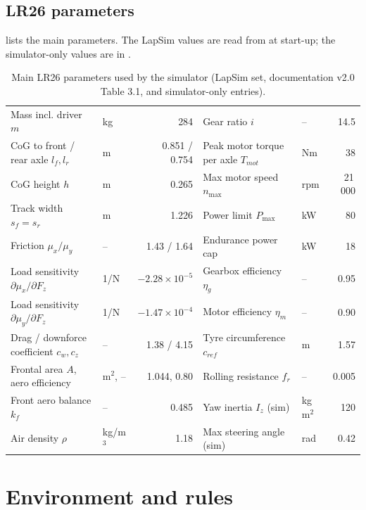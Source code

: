 \documentclass[11pt]{article}
\begin{document}
\subsection{LR26 parameters}
 lists the main parameters. The LapSim values are read from  at start-up; the
simulator-only values are in .

\begin{table}[t]
\centering\small
\caption{Main LR26 parameters used by the simulator (LapSim set, documentation v2.0 Table 3.1, and simulator-only
entries).}
\label{tab:params}
\setlength{\tabcolsep}{4pt}\footnotesize
\begin{tabular}{@{}llr|llr@{}}
\toprule
Mass incl. driver $m$ & kg & 284 & Gear ratio $i$ & -- & 14.5\\
CoG to front / rear axle $l_f,l_r$ & m & 0.851 / 0.754 & Peak motor torque per axle $T_{mot}$ & Nm & 38\\
CoG height $h$ & m & 0.265 & Max motor speed $n_{\max}$ & rpm & 21\,000\\
Track width $s_f=s_r$ & m & 1.226 & Power limit $P_{\max}$ & kW & 80\\
Friction $\mu_x / \mu_y$ & -- & 1.43 / 1.64 & Endurance power cap & kW & 18\\
Load sensitivity $\partial\mu_x/\partial F_z$ & 1/N & $-2.28\times10^{-5}$ & Gearbox efficiency $\eta_g$ & -- & 0.95\\
Load sensitivity $\partial\mu_y/\partial F_z$ & 1/N & $-1.47\times10^{-4}$ & Motor efficiency $\eta_m$ & -- & 0.90\\
Drag / downforce coefficient $c_w,c_z$ & -- & 1.38 / 4.15 & Tyre circumference $c_{ref}$ & m & 1.57\\
Frontal area $A$, aero efficiency & m$^2$, -- & 1.044, 0.80 & Rolling resistance $f_r$ & -- & 0.005\\
Front aero balance $k_f$ & -- & 0.485 & Yaw inertia $I_z$ (sim) & kg\,m$^2$ & 120\\
Air density $\rho$ & kg/m$^3$ & 1.18 & Max steering angle (sim) & rad & 0.42\\
\bottomrule
\end{tabular}
\end{table}

\section{Environment and rules}\label{sec:rules}
\end{document}
